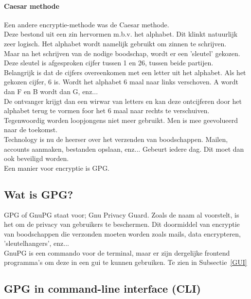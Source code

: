 \documentclass[12pt]{article}
\begin{document}
			\paragraph{Caesar methode}
				Een andere encryptie-methode was de Caesar methode.\\
				Deze bestond uit een zin hervormen m.b.v. het alphabet. Dit klinkt natuurlijk zeer 						logisch.
				Het alphabet wordt namelijk gebruikt om zinnen te schrijven.\\
				Maar na het schrijven van de nodige boodschap, wordt er een 'sleutel' gekozen. Deze 					sleutel is afgesproken cijfer tussen 1 en 26, tussen beide partijen.\\
				Belangrijk is dat de cijfers overeenkomen met een letter uit het alphabet. Als het 						gekozen cijfer, 6 is. Wordt het alphabet 6 maal naar links verschoven. A wordt dan F 					en B wordt dan G, enz...\\
				De ontvanger krijgt dan een wirwar van letters en kan deze ontcijferen door het 						alphabet terug te vormen foor het 6 maal naar rechts te verschuiven.\\


				Tegenwoordig worden loopjongens niet meer gebruikt. Men is mee geevolueerd naar de 						toekomst.\\
				Technology is nu de heerser over het verzenden van boodschappen.
				Mailen, accounts aanmaken, bestanden opslaan, enz... Gebeurt iedere dag. Dit moet dan 					ook beveiligd worden.\\
				Een manier voor encryptie is GPG.

			\newpage
			\subsection{Wat is GPG?}
				GPG of GnuPG staat voor; Gnu Privacy Guard. Zoals de naam al voorstelt, is het om de 					privacy van gebruikers te beschermen. Dit doormiddel van encryptie van boodschappen 					die verzonden moeten worden zoals mails, data encrypteren, 'sleutelhangers', enz... 					\\
				GnuPG is een commando voor de terminal, maar er zijn dergelijke frontend programma's 					om deze in een gui te kunnen gebruiken. Te zien in Subsectie~\ref{GUI}

			\subsection{GPG in command-line interface (CLI)}\label{CLI}
				
\end{document}
